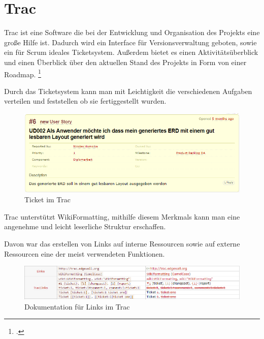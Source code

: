 \section{Trac}
\fib{}

\noindent
Trac ist eine Software die bei der Entwicklung und Organisation des Projekts eine große Hilfe ist. Dadurch wird ein Interface für Versionsverwaltung geboten, sowie ein für Scrum ideales Ticketsystem. Außerdem bietet es einen Aktivitätsüberblick und einen Überblick über den aktuellen Stand des Projekts in Form von einer Roadmap.
\footcite{noauthor_trac_nodate}

\noindent
Durch das Ticketsystem kann man mit Leichtigkeit die verschiedenen Aufgaben verteilen und feststellen ob sie fertiggestellt wurden.
\\
\begin{figure}[h]
	\begin{center}
		\includegraphics[width=16cm]{images/Trac_Tickets.png}
		\caption{Ticket im Trac}
		\label{Trac Ticket}
	\end{center}
\end{figure}

\noindent
Trac unterstützt WikiFormatting, mithilfe diesem Merkmals kann man eine angenehme und leicht leserliche Struktur erschaffen.

\noindent
Davon war das erstellen von Links auf interne Ressourcen sowie auf externe Ressourcen eine der meist verwendeten Funktionen.
\begin{figure}[h]
	\begin{center}
		\includegraphics[width=16cm]{images/Trac_Links.png}
		\caption{Dokumentation für Links im Trac}
		\label{Trac Links}
	\end{center}
\end{figure}